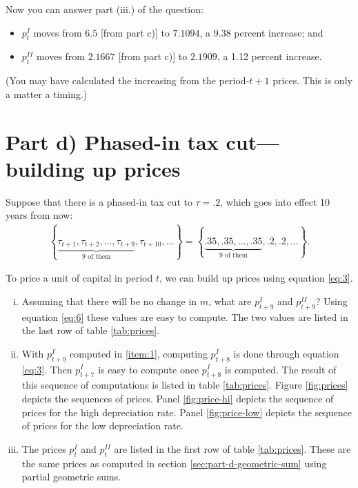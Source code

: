 \documentclass[12pt]{pracjourn_rwr}
\theoremstyle{definition}
\theoremstyle{remark}
\begin{document}
Now you can answer part (iii.) of the question:
\begin{itemize}
\item $p_{t}^{I}$ moves from $6.5$ [from part c)] to $7.1094$, a 9.38 percent increase; and
\item $p_{t}^{II}$ moves from $2.1667$ [from part c)] to $2.1909$, a 1.12 percent increase.
\end{itemize}

(You may have calculated the increasing from the period-$t+1$ prices.
This is only a matter a timing.)

\section{Part d) Phased-in tax cut---building up prices}

Suppose that there is a phased-in tax cut to $\tau = .2$,
which goes into effect 10 years from now:
\begin{align*}
\left\{ \underbrace{\tau_{t+1},\tau_{t+2},\dots,\tau_{t+9}}_{\text{9 of them}},\tau_{t+10},\dots \right\} =
\left\{ \underbrace{.35, .35, \dots, .35}_{\text{9 of them}},.2, .2,\dots \right\}.
\end{align*}

To price a unit of capital in period $t$,
we can build up prices using equation \eqref{eq:3}.
\begin{enumerate}[i.)]
\item\label{item:1} Assuming that there will be no change in $m$,
what are $p_{t+9}^{I}$ and $p_{t+9}^{II}$?
Using equation \eqref{eq:6} these values are easy to compute.
The two values are listed in the last row of table \ref{tab:prices}.
\item\label{item:2} With $p_{t+9}^{I}$ computed in \ref{item:1},
computing $p_{t+8}^{I}$ is done through equation \eqref{eq:3}.
Then $p_{t+7}^{I}$ is easy to compute once $p_{t+8}^{I}$ is computed.
The result of this sequence of computations is listed in table \ref{tab:prices}.
Figure \ref{fig:prices} depicts the sequences of prices.
Panel \ref{fig:price-hi} depicts the sequence of prices for the high depreciation rate.
Panel \ref{fig:price-low} depicts the sequence of prices for the low depreciation rate. 
\item\label{item:3} The prices $p_{t}^{I}$ and $p_{t}^{II}$ are listed in the first row of table \ref{tab:prices}.
These are the same prices as computed in section \ref{sec:part-d-geometric-sum} using partial geometric sums.
\end{enumerate}
\end{document}
